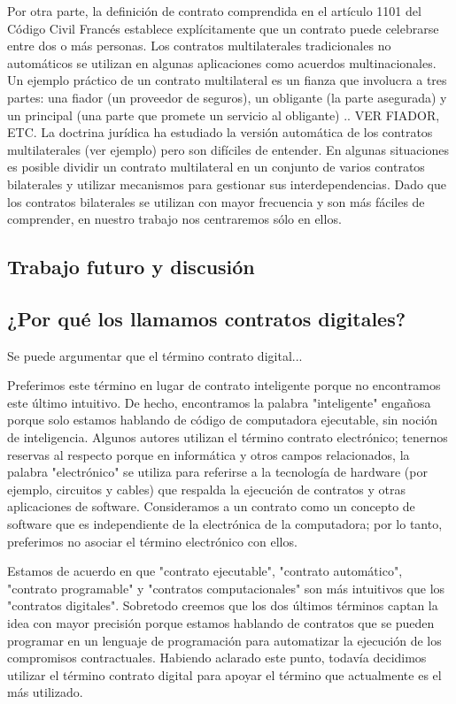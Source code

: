 \documentclass[12pt]{report} %
\begin{document}
Por otra parte, la definición de contrato comprendida en el artículo 1101 del Código Civil Francés\cite{JohnCart2016} establece explícitamente que un contrato puede celebrarse entre dos o más personas. Los contratos multilaterales tradicionales no automáticos se utilizan en algunas aplicaciones como acuerdos multinacionales. Un ejemplo práctico de un contrato multilateral es un fianza que involucra a tres partes: una fiador (un proveedor de seguros), un obligante (la parte asegurada) y un principal (una parte que promete un servicio al obligante) \cite{Charlie1994}.. VER FIADOR, ETC. La doctrina jurídica ha  estudiado la versión automática de los contratos multilaterales (ver ejemplo\cite{LaiXu2004}) pero son difíciles de entender. En algunas situaciones es posible dividir un contrato multilateral en un conjunto de varios contratos bilaterales y utilizar mecanismos para gestionar sus interdependencias. Dado que los contratos bilaterales se utilizan con mayor frecuencia y son más fáciles de comprender, en nuestro trabajo nos centraremos sólo en ellos.

\subsection{Trabajo futuro y discusión}
\label{futurework}
\subsection{¿Por qué los llamamos contratos digitales?}

Se puede argumentar que el término contrato digital...

Preferimos este término en lugar de contrato inteligente porque no encontramos este último intuitivo. De hecho, encontramos la palabra "inteligente" engañosa porque solo estamos hablando de código de computadora ejecutable, sin noción de inteligencia. Algunos autores utilizan el término contrato electrónico; tenernos reservas al respecto porque en informática y otros campos relacionados, la palabra "electrónico" se utiliza para referirse a la tecnología de hardware (por ejemplo, circuitos y cables) que respalda la ejecución de contratos y otras aplicaciones de software. Consideramos a un contrato como un concepto de software que es independiente de la electrónica de la computadora; por lo tanto, preferimos no asociar el término electrónico con ellos.

Estamos de acuerdo en que "contrato ejecutable", "contrato automático", "contrato programable" y "contratos computacionales" son más intuitivos que los "contratos digitales". Sobretodo creemos que los dos últimos términos captan la idea con mayor precisión porque estamos hablando de contratos que se pueden programar en un lenguaje de programación para automatizar la ejecución de los compromisos contractuales. Habiendo aclarado este punto, todavía decidimos utilizar el término contrato digital para apoyar el término que actualmente es el más utilizado.
\end{document}
